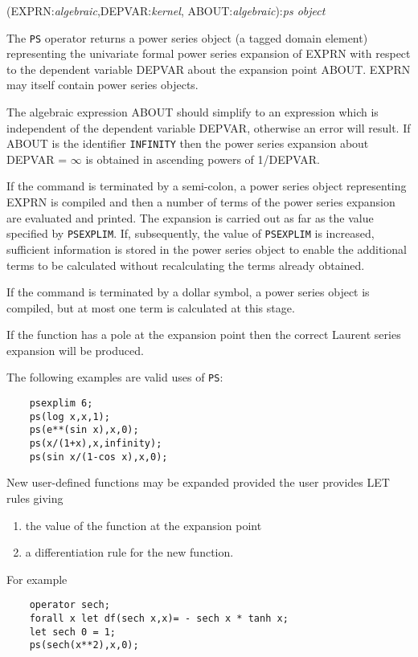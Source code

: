 (EXPRN:{\em algebraic},DEPVAR:{\em kernel},
ABOUT:{\em algebraic}):{\em ps object}

The {\tt PS} operator returns a  power series object
(a tagged domain element)
representing the univariate formal power series expansion of EXPRN with
respect to the dependent variable DEPVAR about the expansion point
ABOUT.  EXPRN may itself contain power series objects.

The algebraic expression ABOUT should simplify to an expression
which is independent of the dependent variable DEPVAR, otherwise
an error will result.  If ABOUT is the identifier {\tt INFINITY}
then the power series expansion about DEPVAR = $\infty$ is
obtained in ascending powers of 1/DEPVAR.

If the command is terminated by a semi-colon, a power series object
representing EXPRN is compiled and then a number of terms of the
power series expansion are evaluated and printed.  The expansion is
carried out as far as the value specified by {\tt PSEXPLIM}.  If,
subsequently, the value of {\tt PSEXPLIM} is increased, sufficient
information is stored in the power series object to enable the
additional terms to be calculated without recalculating the terms
already obtained.

If the command is terminated by a dollar symbol, a power series object
is compiled, but at most one term is calculated at this stage.

If the function has a pole at the expansion point then the correct
Laurent series expansion will be produced.

\noindent The following examples are valid uses of {\tt PS}:
\begin{verbatim}
    psexplim 6;
    ps(log x,x,1);
    ps(e**(sin x),x,0);
    ps(x/(1+x),x,infinity);
    ps(sin x/(1-cos x),x,0);
\end{verbatim}

New user-defined functions may be expanded provided the user provides
LET rules giving

\begin{enumerate}
\item the value of the function at the expansion point
\item a differentiation rule for the new function.
\end{enumerate}

\noindent For example
\begin{verbatim}
    operator sech;
    forall x let df(sech x,x)= - sech x * tanh x;
    let sech 0 = 1;
    ps(sech(x**2),x,0);
\end{verbatim}
 
